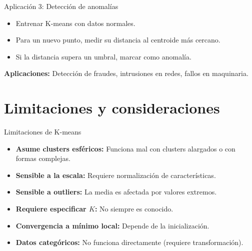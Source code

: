 \documentclass[aspectratio=169]{beamer}
\begin{document}
\begin{frame}{Aplicación 3: Detección de anomalías}
    \begin{itemize}
        \item Entrenar K-means con datos normales.
        \item Para un nuevo punto, medir su distancia al centroide más cercano.
        \item Si la distancia supera un umbral, marcar como anomalía.
    \end{itemize}
    
    \begin{center}
    \end{center}
    
    \textbf{Aplicaciones:} Detección de fraudes, intrusiones en redes, fallos en maquinaria.
\end{frame}

\section{Limitaciones y consideraciones}

\begin{frame}{Limitaciones de K-means}
    \begin{itemize}
        \item \textbf{Asume clusters esféricos:} Funciona mal con clusters alargados o con formas complejas.
        \item \textbf{Sensible a la escala:} Requiere normalización de características.
        \item \textbf{Sensible a outliers:} La media es afectada por valores extremos.
        \item \textbf{Requiere especificar \(K\):} No siempre es conocido.
        \item \textbf{Convergencia a mínimo local:} Depende de la inicialización.
        \item \textbf{Datos categóricos:} No funciona directamente (requiere transformación).
    \end{itemize}
\end{frame}
\end{document}
